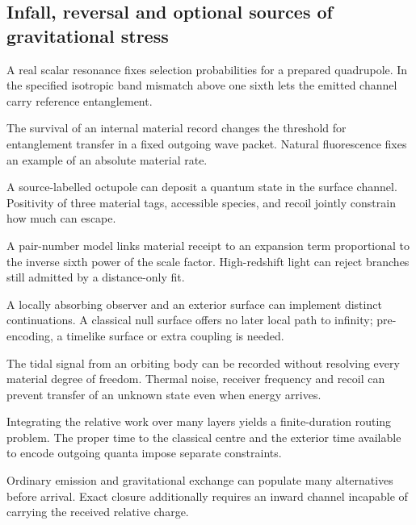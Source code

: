 \subsection{Infall, reversal and optional sources of gravitational stress}
\begin{description}\small
\setlength{\itemsep}{.25em}\setlength{\parskip}{0pt}
\item[\textnormal{\texttt{RES-0110}}] A real scalar resonance fixes selection probabilities for a prepared quadrupole. In the specified isotropic band mismatch above one sixth lets the emitted channel carry reference entanglement.
\item[\textnormal{\texttt{RES-0111}}] The survival of an internal material record changes the threshold for entanglement transfer in a fixed outgoing wave packet. Natural fluorescence fixes an example of an absolute material rate.
\item[\textnormal{\texttt{RES-0112}}] A source-labelled octupole can deposit a quantum state in the surface channel. Positivity of three material tags, accessible species, and recoil jointly constrain how much can escape.
\item[\textnormal{\texttt{RES-0113}}] A pair-number model links material receipt to an expansion term proportional to the inverse sixth power of the scale factor. High-redshift light can reject branches still admitted by a distance-only fit.
\item[\textnormal{\texttt{RES-0114}}] A locally absorbing observer and an exterior surface can implement distinct continuations. A classical null surface offers no later local path to infinity; pre-encoding, a timelike surface or extra coupling is needed.
\item[\textnormal{\texttt{RES-0115}}] The tidal signal from an orbiting body can be recorded without resolving every material degree of freedom. Thermal noise, receiver frequency and recoil can prevent transfer of an unknown state even when energy arrives.
\item[\textnormal{\texttt{RES-0116}}] Integrating the relative work over many layers yields a finite-duration routing problem. The proper time to the classical centre and the exterior time available to encode outgoing quanta impose separate constraints.
\item[\textnormal{\texttt{RES-0117}}] Ordinary emission and gravitational exchange can populate many alternatives before arrival. Exact closure additionally requires an inward channel incapable of carrying the received relative charge.

\end{description}
